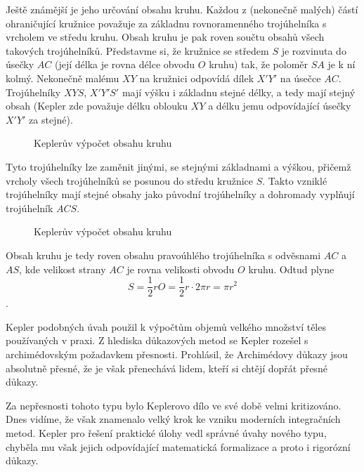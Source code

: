       
      Ještě známější je jeho určování obsahu kruhu. Každou z (nekonečně malých) částí ohraničující
      kružnice považuje za základnu rovnoramenného trojúhelníka s vrcholem ve středu kruhu. Obsah
      kruhu je pak roven součtu obsahů všech takových trojúhelníků. Představme si, že kružnice se
      středem \(S\) je rozvinuta do úsečky \(AC\) (její délka je rovna délce obvodu \(O\) kruhu)
      tak, že poloměr \(SA\) je k ní kolmý. Nekonečně malému \(XY\) na kružnici odpovídá dílek
      \(X′Y′\) na úsečce \(AC\). Trojúhelníky \(XYS\), \(X′Y′S′\) mají výšku i základnu stejné
      délky, a tedy mají stejný obsah (Kepler zde považuje délku oblouku \(XY\) a délku jemu
      odpovídající úsečky \(X′Y′\) za stejné).

      \begin{figure}[ht!] 
        \centering
        \caption{Keplerův výpočet obsahu kruhu}
        \label{mai:fig104}
      \end{figure}

      Tyto trojúhelníky lze zaměnit jinými, se stejnými základnami a výškou, přičemž vrcholy všech
      trojúhelníků se posunou do středu kružnice \(S\). Takto vzniklé trojúhelníky mají stejné
      obsahy jako původní trojúhelníky a dohromady vyplňují trojúhelník \(ACS\).

      \begin{figure}[ht!]
        \centering
        \caption{Keplerův výpočet obsahu kruhu}
        \label{mai:fig105}
      \end{figure}

      Obsah kruhu je tedy roven obsahu pravoúhlého trojúhelníka s odvěsnami \(AC\) a \(AS\), kde
      velikost strany \(AC\) je rovna velikosti obvodu \(O\) kruhu. Odtud plyne \[S = \dfrac{1}{2}rO
      = \dfrac{1}{2}r\cdot2πr = πr^2\].

      Kepler podobných úvah použil k výpočtům objemů velkého množství těles používaných v praxi. Z
      hlediska důkazových metod se Kepler rozešel s archimédovským požadavkem přesnosti. Prohlásil,
      že Archimédovy důkazy jsou absolutně přesné, že je však přenechává lidem, kteří si chtějí
      dopřát přesné důkazy.

      Za nepřesnosti tohoto typu bylo Keplerovo dílo ve své době velmi kritizováno. Dnes vidíme, že
      však znamenalo velký krok ke vzniku moderních integračních metod. Kepler pro řešení praktické
      úlohy vedl správné úvahy nového typu, chyběla mu však jejich odpovídající matematická
      formalizace a proto i rigorózní důkazy.

